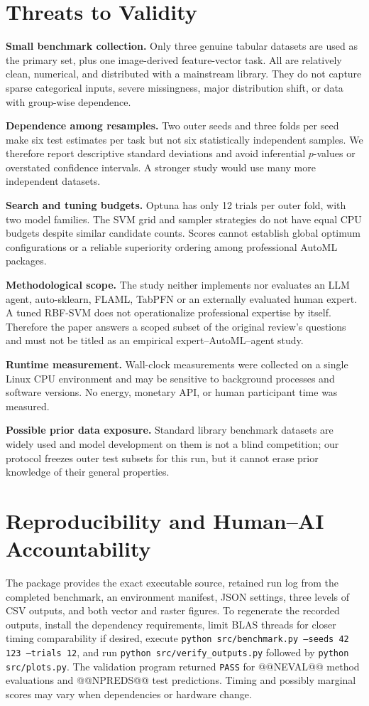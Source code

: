 \documentclass[11pt,a4paper]{article}
\begin{document}
\section{Threats to Validity}
\textbf{Small benchmark collection.} Only three genuine tabular datasets are used as the primary set, plus one image-derived feature-vector task. All are relatively clean, numerical, and distributed with a mainstream library. They do not capture sparse categorical inputs, severe missingness, major distribution shift, or data with group-wise dependence.\par
\textbf{Dependence among resamples.} Two outer seeds and three folds per seed make six test estimates per task but not six statistically independent samples. We therefore report descriptive standard deviations and avoid inferential $p$-values or overstated confidence intervals. A stronger study would use many more independent datasets.\par
\textbf{Search and tuning budgets.} Optuna has only 12 trials per outer fold, with two model families. The SVM grid and sampler strategies do not have equal CPU budgets despite similar candidate counts. Scores cannot establish global optimum configurations or a reliable superiority ordering among professional AutoML packages.\par
\textbf{Methodological scope.} The study neither implements nor evaluates an LLM agent, auto-sklearn, FLAML, TabPFN or an externally evaluated human expert. A tuned RBF-SVM does not operationalize professional expertise by itself. Therefore the paper answers a scoped subset of the original review's questions and must not be titled as an empirical expert--AutoML--agent study.\par
\textbf{Runtime measurement.} Wall-clock measurements were collected on a single Linux CPU environment and may be sensitive to background processes and software versions. No energy, monetary API, or human participant time was measured.\par
\textbf{Possible prior data exposure.} Standard library benchmark datasets are widely used and model development on them is not a blind competition; our protocol freezes outer test subsets for this run, but it cannot erase prior knowledge of their general properties.\par

\section{Reproducibility and Human--AI Accountability}
The package provides the exact executable source, retained run log from the completed benchmark, an environment manifest, JSON settings, three levels of CSV outputs, and both vector and raster figures. To regenerate the recorded outputs, install the dependency requirements, limit BLAS threads for closer timing comparability if desired, execute \texttt{python src/benchmark.py --seeds 42 123 --trials 12}, and run \texttt{python src/verify\_outputs.py} followed by \texttt{python src/plots.py}. The validation program returned \texttt{PASS} for @@NEVAL@@ method evaluations and @@NPREDS@@ test predictions. Timing and possibly marginal scores may vary when dependencies or hardware change.
\end{document}
